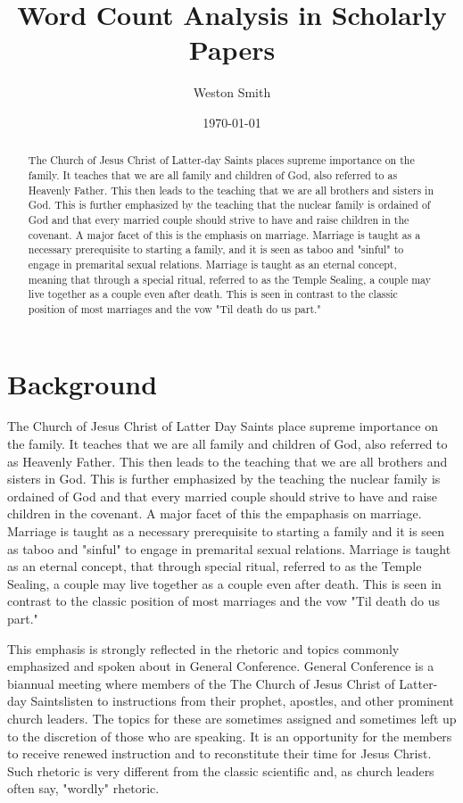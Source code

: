 \documentclass[twocolumn]{article}
\title{Word Count Analysis in Scholarly Papers}
\author[1]{Weston Smith}
\affil[1]{wms29@byu.edu}
\date{\today}
\begin{document}
\newcommand{\church}{The Church of Jesus Christ of Latter-day Saints}

\maketitle

\begin{abstract}
    The Church of Jesus Christ of Latter-day Saints places supreme importance on the family. It teaches that we are all family and children of God, also referred to as Heavenly Father. This then leads to the teaching that we are all brothers and sisters in God. This is further emphasized by the teaching that the nuclear family is ordained of God and that every married couple should strive to have and raise children in the covenant. A major facet of this is the emphasis on marriage. Marriage is taught as a necessary prerequisite to starting a family, and it is seen as taboo and "sinful" to engage in premarital sexual relations. Marriage is taught as an eternal concept, meaning that through a special ritual, referred to as the Temple Sealing, a couple may live together as a couple even after death. This is seen in contrast to the classic position of most marriages and the vow "Til death do us part."

\end{abstract}

\section{Background}
The Church of Jesus Christ of Latter Day Saints place supreme importance on the family. It teaches that we are all family and children of God, also referred to as Heavenly Father. This then leads to the teaching that we are all brothers and sisters in God. This is further emphasized by the teaching the nuclear family is ordained of God and that every married couple should strive to have and raise children in the covenant. A major facet of this the empaphasis on marriage. Marriage is taught as a necessary prerequisite to starting a family and it is seen as taboo and "sinful" to engage in premarital sexual relations. Marriage is taught as an eternal concept, that through special ritual, referred to as the Temple Sealing, a couple may live together as a couple even after death. This is seen in contrast to the classic position of most marriages and the vow "Til death do us part."

This emphasis is strongly reflected in the rhetoric and topics commonly emphasized and spoken about in General Conference. General Conference is a biannual meeting where members of the \church listen to instructions from their prophet, apostles, and other prominent church leaders. The topics for these are sometimes assigned and sometimes left up to the discretion of those who are speaking. It is an opportunity for the members to receive renewed instruction and to reconstitute their time for Jesus Christ. Such rhetoric is very different from the classic scientific and, as church leaders often say, "wordly" rhetoric.
\end{document}

